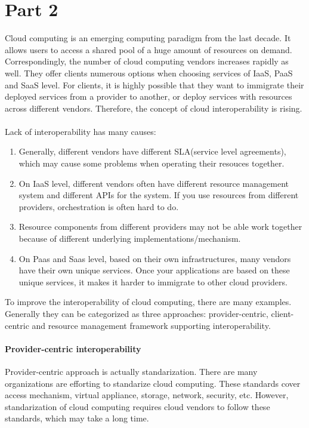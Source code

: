 \documentclass[a4paper,11pt]{article}
\begin{document}
\section{Part 2}
Cloud computing is an emerging computing paradigm from the last decade. It allows users to access a shared pool of a huge amount of resources on demand. Correspondingly, the number of cloud computing vendors increases rapidly as well. They offer clients numerous options when choosing services of IaaS, PaaS and SaaS level. For clients, it is highly possible that they want to immigrate their deployed services from a provider to another, or deploy services with resources across different vendors. Therefore, the concept of cloud interoperability is rising.\cite{zhang2013survey} \\\\
Lack of interoperability has many causes: 
\begin{enumerate}
    \item Generally, different vendors have different SLA(service level agreements), which may cause some problems when operating their resouces together. 
    \item On IaaS level, different vendors often have different resource management system and different APIs for the system. If you use resources from different providers, orchestration is often hard to do. 
    \item Resource components from different providers may not be able work together because of different underlying implementations/mechanism. 
    \item On Paas and Saas level, based on their own infrastructures, many vendors have their own unique services. Once your applications are based on these unique services, it makes it harder to immigrate to other cloud providers.\cite{dillon2010cloud}
\end{enumerate}
To improve the interoperability of cloud computing, there are many examples. Generally they can be categorized as three approaches: provider-centric, client-centric and resource management framework supporting interoperability.\cite{dillon2010cloud}\cite{parameswaran2009cloud}\\
\paragraph{Provider-centric interoperability}
Provider-centric approach is actually standarization. There are many organizations are efforting to standarize cloud computing. These standards cover access mechanism, virtual appliance, storage, network, security, etc.\cite{wiki:OVF}\cite{wiki:CDMI}\cite{wiki:OCCI} However, standarization of cloud computing requires cloud vendors to follow these standards, which may take a long time. 
\end{document}
